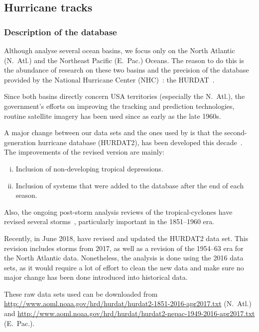 \subsection{Hurricane tracks}\label{ssec:hurdat}
\subsubsection{Description of the database}\label{ssec:hurdat-intro}
Although \citeauthor{Corral2010} analyse several ocean basins, we focus only on the North Atlantic (N.~Atl.) and the Northeast Pacific (E.~Pac.) Oceans. The reason to do this is the abundance of research on these two basins and the precision of the database provided by the National Hurricane Center (NHC)~\cite{o:NHC}: the HURDAT~\cite{o:hurdat2}.

Since both basins directly concern USA territories (especially the N.~Atl.), the government's efforts on improving the tracking and prediction technologies, routine satellite imagery has been used since as early as the late 1960s.

A major change between our data sets and the ones used by \textcite{Corral2010} is that the second-generation hurricane database (HURDAT2), has been developed this decade~\cite{Landsea2013}. The improvements of the revised version are mainly:
\begin{enumerate}[(i)]
	\item Inclusion of non-developing tropical depressions.
	\item Inclusion of systems that were added to the database after the end of each season.
\end{enumerate}
Also, the ongoing post-storm analysis reviews of the tropical-cyclones have revised several storms~\cite{o:hurdat-comparison}, particularly important in the 1851--1960 era.

\medskip
Recently, in June 2018, \textcite{Delgado2018} have revised and updated the HURDAT2 data set. This revision includes storms from 2017, as well as a revision of the 1954--63 era for the North Atlantic data. Nonetheless, the analysis is done using the 2016 data sets, as it would require a lot of effort to clean the new data and make sure no major change has been done introduced into historical data.

These raw data sets used can be downloaded from \url{http://www.aoml.noaa.gov/hrd/hurdat/hurdat2-1851-2016-apr2017.txt} (N.~Atl.) and \url{http://www.aoml.noaa.gov/hrd/hurdat/hurdat2-nepac-1949-2016-apr2017.txt} (E.~Pac.).

